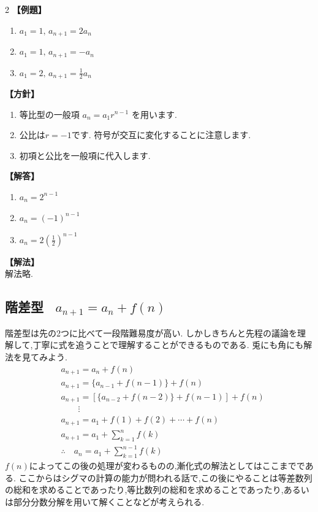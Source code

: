 \documentclass[dvipdfmx,a4paper,11pt,fleqn,openany]{jsbook}
\begin{document}
\begin{multicols*}{2}
      \noindent \textbf{【例題】}
      \begin{enumerate}[label=(\arabic*),parsep=3pt]
        \item $\displaystyle a_1=1,\, a_{n+1}=2a_n$
        \item $\displaystyle a_1=1,\, a_{n+1}=-a_n$
        \item $\displaystyle a_1=2,\, a_{n+1}=\frac{1}{2}a_n$
      \end{enumerate}

      \noindent\textbf{【方針】}
      \begin{enumerate}[label=(\arabic*),parsep=3pt]
        \item 等比型の一般項
              $\displaystyle a_n=a_1r^{n-1}$
              を用います.
        \item 公比は$r=-1$です.
              符号が交互に変化することに注意します.
        \item 初項と公比を一般項に代入します.
      \end{enumerate}

      \noindent\textbf{【解答】}
      \begin{enumerate}[label=(\arabic*),parsep=3pt]
        \item $\displaystyle a_n=2^{n-1}$
        \item $\displaystyle a_n=(-1)^{n-1}$
        \item $\displaystyle a_n=2\left(\frac12\right)^{n-1}$
      \end{enumerate}

      \noindent\textbf{【解法】}\\
      解法略.

    \subsection{階差型 \, $a_{n+1}=a_n+f(n)$}
      階差型は先の2つに比べて一段階難易度が高い.
      しかしきちんと先程の議論を理解して,丁寧に式を追うことで理解することができるものである.
      兎にも角にも解法を見てみよう.
      \begin{align*}
        &a_{n+1}=a_n+f(n)\\
        &a_{n+1}=\{a_{n-1}+f(n-1)\}+f(n)\\
        &a_{n+1}=\left[\{a_{n-2}+f(n-2)\}+f(n-1)\right]+f(n)\\
        &\qquad \vdots\\
        &a_{n+1}=a_1+f(1)+f(2)+\cdots+f(n)\\
        &a_{n+1}=a_1+\sum_{k=1}^{n} f(k)\\
        &\therefore \quad a_n=a_1+\sum_{k=1}^{n-1} f(k)
      \end{align*}
      $f(n)$によってこの後の処理が変わるものの,漸化式の解法としてはここまでである.
      ここからはシグマの計算の能力が問われる話で,この後にやることは等差数列の総和を求めることであったり,等比数列の総和を求めることであったり,あるいは部分分数分解を用いて解くことなどが考えられる.


\end{multicols*}
\end{document}
